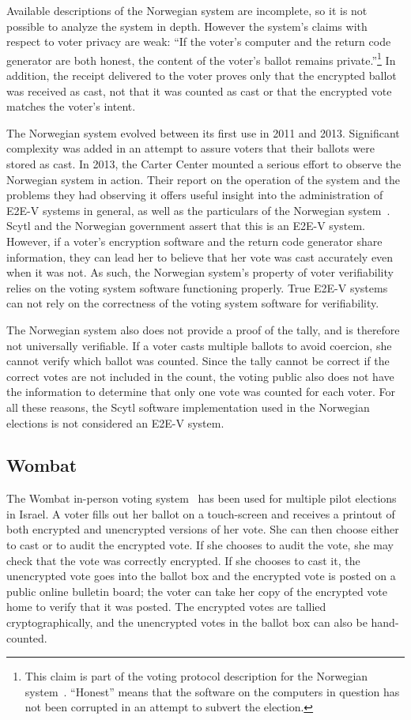 Available descriptions of the Norwegian system are incomplete, so it
is not possible to analyze the system in depth. However the system's
claims with respect to voter privacy are weak: ``If the voter's
computer and the return code generator are both honest, the content of
the voter's ballot remains private.''\footnote{This claim is part of
  the voting protocol description for the Norwegian
  system~\cite{gjosteen2012}. ``Honest'' means that the software on
  the computers in question has not been corrupted in an attempt to
  subvert the election.} In addition, the receipt delivered to the
voter proves only that the encrypted ballot was received as cast, not
that it was counted as cast or that the encrypted vote matches the
voter's intent.

The Norwegian system evolved between its first use in 2011 and
2013. Significant complexity was added in an attempt to assure voters
that their ballots were stored as cast. In 2013, the Carter Center
mounted a serious effort to observe the Norwegian system in
action. Their report on the operation of the system and the problems
they had observing it offers useful insight into the administration of
E2E-V systems in general, as well as the particulars of the Norwegian
system~\cite{carter2013}. Scytl and the Norwegian government assert
that this is an E2E-V system. However, if a voter's encryption
software and the return code generator share information, they can
lead her to believe that her vote was cast accurately even when it was
not. As such, the Norwegian system's property of voter verifiability
relies on the voting system software functioning properly. True E2E-V
systems can not rely on the correctness of the voting system software
for verifiability.

The Norwegian system also does not provide a proof of the tally, and
is therefore not universally verifiable. If a voter casts multiple
ballots to avoid coercion, she cannot verify which ballot was
counted. Since the tally cannot be correct if the correct votes are
not included in the count, the voting public also does not have the
information to determine that only one vote was counted for each
voter. For all these reasons, the Scytl software implementation used
in the Norwegian elections is not considered an E2E-V system.

\subsection{Wombat}

The Wombat in-person voting system~\cite{rosen2011} has been used for
multiple pilot elections in Israel. A voter fills out her ballot on a
touch-screen and receives a printout of both encrypted and unencrypted
versions of her vote. She can then choose either to cast or to audit
the encrypted vote. If she chooses to audit the vote, she may check
that the vote was correctly encrypted. If she chooses to cast it, the
unencrypted vote goes into the ballot box and the encrypted vote is
posted on a public online bulletin board; the voter can take her copy
of the encrypted vote home to verify that it was posted. The encrypted
votes are tallied cryptographically, and the unencrypted votes in the
ballot box can also be hand-counted.

